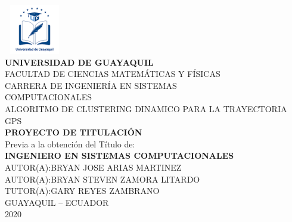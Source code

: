 \documentclass[12pt, a4paper, nofontenc, numbers=endperiod]{apa7}
\begin{document}
	
	\thispagestyle{empty}
	{ %
		\begin{center}		
			\includegraphics[width=2.65cm,height=2.17cm]{Imagenes/Figura1}	\\
			\textbf{\Large UNIVERSIDAD DE GUAYAQUIL} \\ [0.5cm]
			{\large FACULTAD DE CIENCIAS MATEMÁTICAS Y FÍSICAS}\\
			{\large CARRERA DE INGENIERÍA EN SISTEMAS \\  COMPUTACIONALES } \\ [0.5cm]
			{\large ALGORITMO DE CLUSTERING DINAMICO PARA LA TRAYECTORIA GPS\\
			{\textbf{\large PROYECTO DE TITULACIÓN}} \\ [0.5cm]
			{\large Previa a la obtención del Título de:} \\ [0.5cm]
			{\textbf{\large  INGENIERO EN SISTEMAS COMPUTACIONALES}} \\ [0.5cm]
			{\large  AUTOR(A):BRYAN JOSE ARIAS MARTINEZ} \\ [0.5cm]
			{\large  AUTOR(A):BRYAN STEVEN ZAMORA LITARDO} \\ [0.5cm]
			{\large  TUTOR(A):GARY REYES ZAMBRANO} \\ [0.5cm]
			{\large  GUAYAQUIL – ECUADOR}\\
				2020
			}
		
		
		\end{center}
	}
	\newpage
	\thispagestyle{empty}
\end{document}
